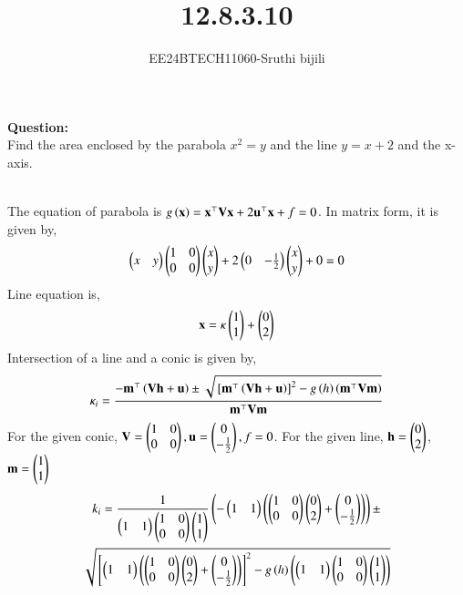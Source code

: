 \documentclass[journal]{IEEEtran}
\begin{document}

\vspace{3cm}

\title{12.8.3.10}
\author{EE24BTECH11060-Sruthi bijili}
{\let\newpage\relax\maketitle}
\textbf{Question:}\\
Find the area enclosed by the parabola $x^2=y$ and the line $y=x+2$ and the x-axis.

\solution\\

The equation of parabola is $g \left(\mathbf{x}\right) = \mathbf{x}^{\top}\mathbf{V}\mathbf{x} + 2 \mathbf{u}^{\top}\mathbf{x} + f = 0$. In matrix form, it is given by,
\begin{align}
	\begin{pmatrix}x & y\end{pmatrix} \begin{pmatrix}1 & 0 \\ 0 & 0\end{pmatrix} \begin{pmatrix}x \\ y\end{pmatrix} + 2 \begin{pmatrix}0 & -\frac{1}{2}\end{pmatrix} \begin{pmatrix}x \\ y\end{pmatrix} + 0 = 0
\end{align}
Line equation is,
\begin{align}
	\mathbf{x} = \kappa \begin{pmatrix}1 \\ 1\end{pmatrix} + \begin{pmatrix}0 \\ 2\end{pmatrix}
\end{align}
Intersection of a line and a conic is given by,
\begin{align}
	\kappa_i = \frac{-\mathbf{m}^{\top}\left(\mathbf{Vh}+\mathbf{u}\right)\pm\sqrt{{}\left[\mathbf{m}^{\top}\left(\mathbf{Vh}+\mathbf{u}\right)\right]^2-g\left(h\right)\left(\mathbf{m}^{\top}\mathbf{Vm}\right)}}{\mathbf{m}^{\top}\mathbf{Vm}}
\end{align}
For the given conic, $\mathbf{V}=\begin{pmatrix}1 & 0 \\ 0 & 0 \end{pmatrix}, \mathbf{u} = \begin{pmatrix}0 \\ -\frac{1}{2}\end{pmatrix}, f = 0$. For the given line, $\mathbf{h}=\begin{pmatrix}0 \\ 2\end{pmatrix}$, $\mathbf{m}=\begin{pmatrix}1 \\ 1\end{pmatrix}$
\begin{multline}
     k_i =\frac{1}{\begin{pmatrix}1 
 & 1\end{pmatrix}\begin{pmatrix}1 &0  \\ 0 & 0\end{pmatrix}\begin{pmatrix}1 \\ 1\end{pmatrix}}\left(-\begin{pmatrix}1&1\end{pmatrix}\left(\begin{pmatrix}1&0\\0&0\end{pmatrix}\begin{pmatrix}0\\2\end{pmatrix}+\begin{pmatrix}0\\ -\frac{1}{2}\end{pmatrix}\right)\right)\pm \\
     \sqrt{{}\left[\begin{pmatrix}1&1\end{pmatrix}\left(\begin{pmatrix}1&0\\0&0\end{pmatrix}\begin{pmatrix}0\\2\end{pmatrix}+\begin{pmatrix}0\\-\frac{1}{2}\end{pmatrix}\right)\right]^2-g\left(h\right)\left(\begin{pmatrix}1&1\end{pmatrix}\begin{pmatrix}1&0\\0&0\end{pmatrix}\begin{pmatrix}1\\1\end{pmatrix}\right)} 
\end{multline}
\end{document}
